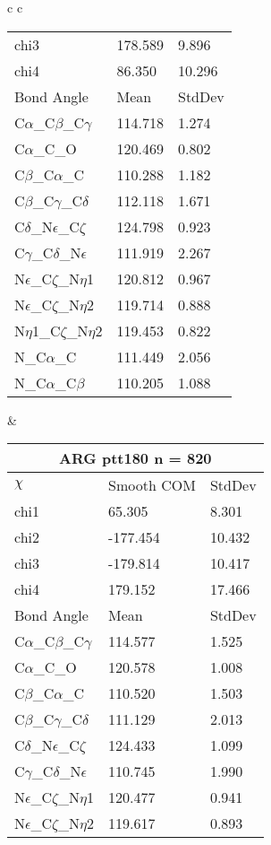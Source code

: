 \begin{longtable}{ c c }
\begin{tabular}{ l l l }
  chi3 & 178.589 & 9.896 \\ 
  chi4 & 86.350 & 10.296 \\ \midrule
  Bond Angle   & Mean     & StdDev \\ \midrule
  C$\alpha$\_C$\beta$\_C$\gamma$ & 114.718 & 1.274\\
  C$\alpha$\_C\_O & 120.469 & 0.802\\
  C$\beta$\_C$\alpha$\_C & 110.288 & 1.182\\
  C$\beta$\_C$\gamma$\_C$\delta$ & 112.118 & 1.671\\
  C$\delta$\_N$\epsilon$\_C$\zeta$ & 124.798 & 0.923\\
  C$\gamma$\_C$\delta$\_N$\epsilon$ & 111.919 & 2.267\\
  N$\epsilon$\_C$\zeta$\_N$\eta$1 & 120.812 & 0.967\\
  N$\epsilon$\_C$\zeta$\_N$\eta$2 & 119.714 & 0.888\\
  N$\eta$1\_C$\zeta$\_N$\eta$2 & 119.453 & 0.822\\
  N\_C$\alpha$\_C & 111.449 & 2.056\\
  N\_C$\alpha$\_C$\beta$ & 110.205 & 1.088\\
  \bottomrule
  \end{tabular}
  &
  \begin{tabular}{ l l l }
  \toprule
  \multicolumn{3}{c}{ARG \textbf{ptt180} n = 820} \\ \toprule
  $\chi$       & Smooth COM & StdDev \\ \midrule
  chi1 & 65.305 & 8.301 \\ 
  chi2 & -177.454 & 10.432 \\ 
  chi3 & -179.814 & 10.417 \\ 
  chi4 & 179.152 & 17.466 \\ \midrule
  Bond Angle   & Mean     & StdDev \\ \midrule
  C$\alpha$\_C$\beta$\_C$\gamma$ & 114.577 & 1.525\\
  C$\alpha$\_C\_O & 120.578 & 1.008\\
  C$\beta$\_C$\alpha$\_C & 110.520 & 1.503\\
  C$\beta$\_C$\gamma$\_C$\delta$ & 111.129 & 2.013\\
  C$\delta$\_N$\epsilon$\_C$\zeta$ & 124.433 & 1.099\\
  C$\gamma$\_C$\delta$\_N$\epsilon$ & 110.745 & 1.990\\
  N$\epsilon$\_C$\zeta$\_N$\eta$1 & 120.477 & 0.941\\
  N$\epsilon$\_C$\zeta$\_N$\eta$2 & 119.617 & 0.893\\

\end{tabular}
\end{longtable}
